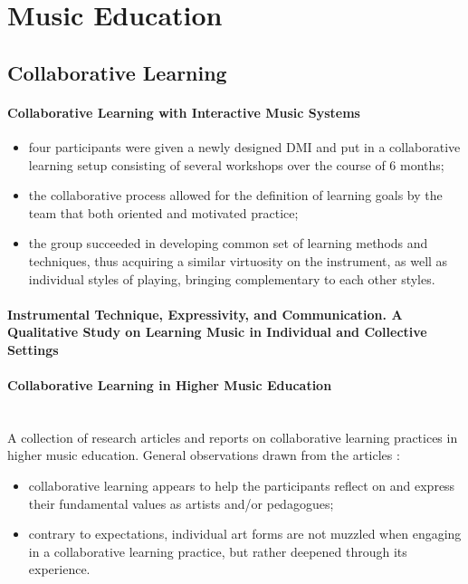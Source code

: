 \documentclass[11pt]{article}
\begin{document}
\section{Music Education}

\subsection{Collaborative Learning}
\paragraph{Collaborative Learning with Interactive Music Systems} \citep{marquez-borbon_collaborative_2020}
\begin{itemize}
    \item four participants were given a newly designed DMI and put in a collaborative learning setup consisting of several workshops over the course of 6 months;
    \item the collaborative process allowed for the definition of learning goals by the team that both oriented and motivated practice;
    \item the group succeeded in developing common set of learning methods and techniques, thus acquiring a similar virtuosity on the instrument, as well as individual styles of playing, bringing complementary to each other styles.
\end{itemize}

\paragraph{Instrumental Technique, Expressivity, and Communication. A Qualitative Study on Learning Music in Individual and Collective Settings} \citep{schiavio_instrumental_2019}

\paragraph{Collaborative Learning in Higher Music Education} \citep{gaunt_collaborative_2016} \\
A collection of research articles and reports on collaborative learning practices in higher music education. General observations drawn from the articles :
\begin{itemize}
    \item collaborative learning appears to help the participants reflect on and express their fundamental values as artists and/or pedagogues;
    \item contrary to expectations, individual art forms are not muzzled when engaging in a collaborative learning practice, but rather deepened through its experience.
\end{itemize}
\end{document}
